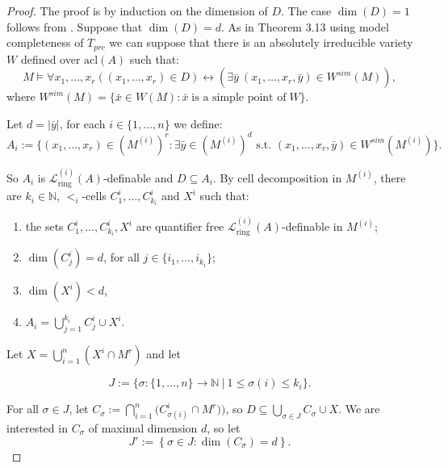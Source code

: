 \documentclass[12pt]{article}
\theoremstyle{definition}
\theoremstyle{mystyle}
\theoremstyle{remark}
\newcommand{\Li}{\mathcal{L}^{(i)}_{\text{ring}}}
\newcommand{\clos}[2]{#1^{(#2)}}
\newcommand{\acl}{\mathrm{acl}}
\begin{document}
\begin{proof}
The proof is by induction on the dimension of $D$. The case
$\dim(D)= 1$ follows from \cite[Theorem 3.13]{Mon}. Suppose that
$\dim(D) = d$. As in Theorem 3.13 \cite{Mon} using model
completeness of $T_{prc}$ we can suppose that there is an
absolutely irreducible variety $W$ defined over $\acl(A)$ such
that:
\[M \models \forall x_1, \ldots,x_r \left(\left(x_1, \ldots,x_r\right) \in D\right) \longleftrightarrow \left( \exists \bar{y}\
\left(x_1, \ldots,x_r, \bar{y}\right) \in
W^{sim}\left(M\right)\right),\] where $W^{sim}(M) = \{\bar{x} \in
W(M): \bar{x} \; \mbox{is a simple point of}\; W\}.$

Let $d = |\bar{y}|$, for each $i \in \{1, \ldots,n\}$ we define:
\[A_i := \{(x_1, \ldots, x_r) \in (\clos{M}{i})^r: \exists \bar{y} \in {(\clos{M}{i})}^d \text{ s.t. } (x_1, \ldots, x_{r}, \bar{y}) \in W^{sim}(\clos{M}{i})\}.\]

So $A_i$ is $\Li(A)$-definable and $D\subseteq A_i$.  By cell
decomposition in $\clos{M}{i}$, there are $k_i\in \mathbb{N}$,
$<_i$-cells $C^i_1, \ldots, C^i_{k_i}$ and $X^i$ such that:
\begin{enumerate}
 \item the sets $C^i_1, \ldots, C^i_{k_i}, X^i$ are quantifier free $\Li(A)$-definable in $\clos{M}{i}$;
\item $\dim(C_j^i)= d$, for all $j \in \{i_1, \ldots, i_{k_i}\}$;
\item $\dim(X^i)< d$, \item $A_i =
\displaystyle{\bigcup_{j=1}^{k_i}C_j^i} \cup X^i$.

 \end{enumerate}

Let $X= \displaystyle{\bigcup_{i=1}^n}(X^i \cap M^r)$ and let

\[J :=\{\sigma:\{1, \ldots, n\} \rightarrow \mathbb N \ |\
1\leq \sigma(i)\leq k_i\}.\]

\medskip

For all $\sigma \in J$, let $C_{\sigma}:=
\displaystyle{\bigcap_{i=1}^n{(C^i_{\sigma(i)}}}\cap M^r))$, so $D
\subseteq \displaystyle{\bigcup_{\sigma \in J}C_{\sigma} \cup X}$.
We are interested in $C_\sigma$ of maximal dimension $d$, so let
\[J' := \left\{\sigma \in J : \dim\left(C_{\sigma}\right)=d\right\}.\]


\end{proof}
\end{document}
